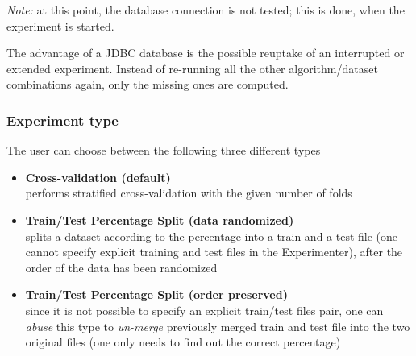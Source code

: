 \documentclass[a4paper]{article}
\begin{document}
\textit{Note:} at this point, the database connection is not tested; this is done, when the experiment is started.

\begin{center}
\end{center}


The advantage of a JDBC database is the possible reuptake of an interrupted or extended experiment. Instead of re-running all the other algorithm/dataset combinations again, only the missing ones are computed.


\subsubsection{Experiment type}

The user can choose between the following three different types

\begin{itemize}
	\item \textbf{Cross-validation (default)} \\
      performs stratified cross-validation with the given number of folds 

   \item \textbf{Train/Test Percentage Split (data randomized)} \\
      splits a dataset according to the percentage into a train and a test file (one cannot specify explicit training and test files in the Experimenter), after the order of the data has been randomized 

	
	\begin{center}
	\end{center}
	

    \item \textbf{Train/Test Percentage Split (order preserved)} \\
      since it is not possible to specify an explicit train/test files pair, one can \textit{abuse} this type to \textit{un-merge} previously merged train and test file into the two original files (one only needs to find out the correct percentage) 

	
	\begin{center}
	\end{center}
	
\end{itemize}
\end{document}
